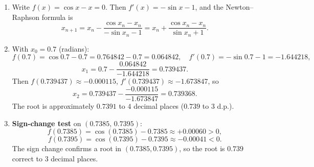 \documentclass[11pt]{article}
\begin{document}
\begin{corrige}[Exercise 8 — The equation $\cos x = x$]
\begin{enumerate}
\item Write $f(x)=\cos x - x =0$. Then $f'(x)=-\sin x -1$, and the Newton--Raphson formula is
\[
x_{n+1}=x_{n}-\frac{\cos x_{n}-x_{n}}{-\sin x_{n}-1}
=x_{n}+\frac{\cos x_{n}-x_{n}}{\sin x_{n}+1}.
\]
\item With $x_{0}=0.7$ (radians):
\[
f(0.7)=\cos 0.7-0.7=0.764842-0.7=0.064842,\quad
f'(0.7)=-\sin0.7-1=-1.644218,
\]
\[
x_{1}=0.7-\frac{0.064842}{-1.644218}=0.739437.
\]
Then $f(0.739437)\approx-0.000115$, $f'(0.739437)\approx-1.673847$, so
\[
x_{2}=0.739437-\frac{-0.000115}{-1.673847}=0.739368.
\]
The root is approximately $0.7391$ to $4$ decimal places ($0.739$ to $3$ d.p.).
\item \textbf{Sign-change test} on $(0.7385,\,0.7395)$:
\[
f(0.7385)=\cos(0.7385)-0.7385\approx+0.00060>0,
\]
\[
f(0.7395)=\cos(0.7395)-0.7395\approx-0.00041<0.
\]
The sign change confirms a root in $(0.7385,0.7395)$, so the root is $\boxed{0.739}$ correct to $3$ decimal places.
\end{enumerate}
\end{corrige}
\end{document}
